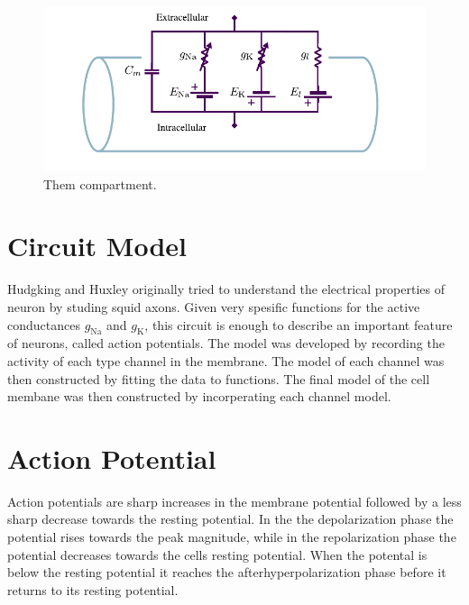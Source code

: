 \documentclass[altfont, fleqn]{uiophd}
\begin{document}
\begin{figure}[h]
    \centering
    \includegraphics[width=1.0\textwidth]{images/2_1/compartment.pdf}
    \caption{Them compartment.}
    \label{fig:2_hud_hux}
\end{figure}

\textcites{hodgkin_quantitative_1952,connor_prediction_1971,sterratt_principles_2011}
\section{Circuit Model}
Hudgking and Huxley originally tried to understand the
electrical properties of neuron by studing squid axons. 
Given very spesific functions for the active conductances $g_\text{Na}$
and $g_\text{K}$, this circuit is enough to describe an important feature
of neurons, called action potentials.
The model was developed by recording the activity of each
type channel in the membrane. 
The model of each channel was then constructed by fitting 
the data to functions. 
The final model of the cell membane was then constructed 
by incorperating each channel model. 

\section{Action Potential}
Action potentials are sharp increases in the membrane potential
followed by a less sharp decrease towards the resting potential. 
In the the depolarization phase the potential rises towards the peak magnitude, 
while in the repolarization phase the potential decreases towards
the cells resting potential.
When the potental is below the resting potential 
it reaches the afterhyperpolarization phase before
it returns to its resting potential.

\end{document}
